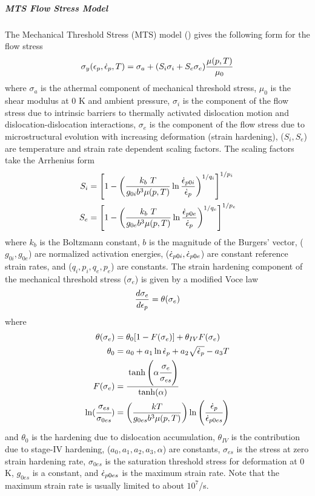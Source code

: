   \subparagraph{MTS Flow Stress Model}
  The Mechanical Threshold Stress (MTS) model
  (\cite{Follans88,Goto00a,Kocks01})
  gives the following form for the flow stress
  \begin{equation}
    \sigma_y(\Ep,\Epdot{},T) = 
      \sigma_a + (S_i \sigma_i + S_e \sigma_e)\frac{\mu(p,T)}{\mu_0} 
  \end{equation}
  where $\sigma_a$ is the athermal component of mechanical threshold stress,
  $\mu_0$ is the shear modulus at 0 K and ambient pressure,
  $\sigma_i$ is the component of the flow stress due to intrinsic barriers
  to thermally activated dislocation motion and dislocation-dislocation
  interactions, $\sigma_e$ is the component of the flow stress due to
  microstructural evolution with increasing deformation (strain hardening),
  ($S_i, S_e$) are temperature and strain rate dependent scaling factors.  The
  scaling factors take the Arrhenius form
  \begin{align}
    S_i & = \left[1 - \left(\frac{k_b~T}{g_{0i}b^3\mu(p,T)}
    \ln\frac{\Epdot{0i}}{\Epdot{}}\right)^{1/q_i}
    \right]^{1/p_i} \\
    S_e & = \left[1 - \left(\frac{k_b~T}{g_{0e}b^3\mu(p,T)}
    \ln\frac{\Epdot{0e}}{\Epdot{}}\right)^{1/q_e}
    \right]^{1/p_e}
  \end{align}
  where $k_b$ is the Boltzmann constant, $b$ is the magnitude of the Burgers'
  vector, ($g_{0i}, g_{0e}$) are normalized activation energies,
  ($\Epdot{0i}, \Epdot{0e}$) are constant reference strain rates, and
  ($q_i, p_i, q_e, p_e$) are constants.  The strain hardening component
  of the mechanical threshold stress ($\sigma_e$) is given by a
  modified Voce law
  \begin{equation}\label{eq:MTSsige}
    \frac{d\sigma_e}{d\Ep} = \theta(\sigma_e)
  \end{equation}
  where
  \begin{align}
    \theta(\sigma_e) & = 
       \theta_0 [ 1 - F(\sigma_e)] + \theta_{IV} F(\sigma_e) \\
    \theta_0 & = a_0 + a_1 \ln \Epdot{} + a_2 \sqrt{\Epdot{}} - a_3 T \\
    F(\sigma_e) & = 
      \cfrac{\tanh\left(\alpha \cfrac{\sigma_e}{\sigma_{es}}\right)}
      {\tanh(\alpha)}\\
    \ln(\cfrac{\sigma_{es}}{\sigma_{0es}}) & =
    \left(\frac{kT}{g_{0es} b^3 \mu(p,T)}\right)
    \ln\left(\cfrac{\Epdot{}}{\Epdot{0es}}\right)
  \end{align}
  and $\theta_0$ is the hardening due to dislocation accumulation,
  $\theta_{IV}$ is the contribution due to stage-IV hardening,
  ($a_0, a_1, a_2, a_3, \alpha$) are constants,
  $\sigma_{es}$ is the stress at zero strain hardening rate,
  $\sigma_{0es}$ is the saturation threshold stress for deformation at 0 K,
  $g_{0es}$ is a constant, and $\Epdot{0es}$ is the maximum strain rate.  Note
  that the maximum strain rate is usually limited to about $10^7$/s.

